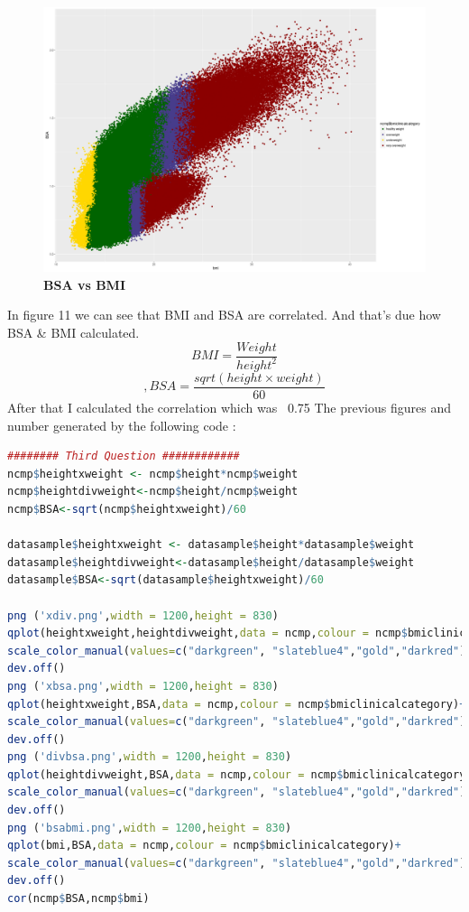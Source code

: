 \documentclass{article}
\begin{document}
	\begin{figure}[H]
		\begin{center}
			\includegraphics[scale=0.4]{bsabmi.png}
		\end{center}
		\caption{\textbf{BSA vs BMI}}
	\end{figure}
	In figure 11 we can see that BMI and BSA are correlated. And that's due how BSA \& BMI calculated.
\[BMI = \frac{Weight}{height^2}\]\[ , BSA = \frac{sqrt(height\times weight)}{60}\]
After that I calculated the correlation which was ~0.75
The previous figures and number generated by the following code :
\begin{lstlisting}[language=R]
######## Third Question ############
ncmp$heightxweight <- ncmp$height*ncmp$weight
ncmp$heightdivweight<-ncmp$height/ncmp$weight
ncmp$BSA<-sqrt(ncmp$heightxweight)/60

datasample$heightxweight <- datasample$height*datasample$weight
datasample$heightdivweight<-datasample$height/datasample$weight
datasample$BSA<-sqrt(datasample$heightxweight)/60

png ('xdiv.png',width = 1200,height = 830)
qplot(heightxweight,heightdivweight,data = ncmp,colour = ncmp$bmiclinicalcategory)+
scale_color_manual(values=c("darkgreen", "slateblue4","gold","darkred"))
dev.off()
png ('xbsa.png',width = 1200,height = 830)
qplot(heightxweight,BSA,data = ncmp,colour = ncmp$bmiclinicalcategory)+
scale_color_manual(values=c("darkgreen", "slateblue4","gold","darkred"))
dev.off()
png ('divbsa.png',width = 1200,height = 830)
qplot(heightdivweight,BSA,data = ncmp,colour = ncmp$bmiclinicalcategory)+
scale_color_manual(values=c("darkgreen", "slateblue4","gold","darkred"))
dev.off()
png ('bsabmi.png',width = 1200,height = 830)
qplot(bmi,BSA,data = ncmp,colour = ncmp$bmiclinicalcategory)+
scale_color_manual(values=c("darkgreen", "slateblue4","gold","darkred"))
dev.off()
cor(ncmp$BSA,ncmp$bmi)
\end{lstlisting}
\end{document}
